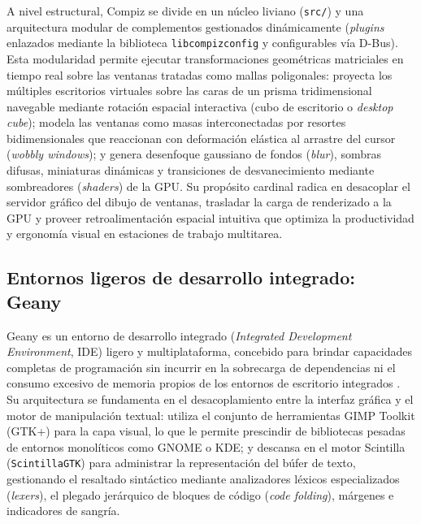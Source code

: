 \documentclass[12pt]{article}
\begin{document}
A nivel estructural, Compiz se divide en un núcleo liviano (\texttt{src/}) y una arquitectura modular de complementos gestionados dinámicamente (\textit{plugins} enlazados mediante la biblioteca \texttt{libcompizconfig} y configurables vía D-Bus). Esta modularidad permite ejecutar transformaciones geométricas matriciales en tiempo real sobre las ventanas tratadas como mallas poligonales: proyecta los múltiples escritorios virtuales sobre las caras de un prisma tridimensional navegable mediante rotación espacial interactiva (cubo de escritorio o \textit{desktop cube}); modela las ventanas como masas interconectadas por resortes bidimensionales que reaccionan con deformación elástica al arrastre del cursor (\textit{wobbly windows}); y genera desenfoque gaussiano de fondos (\textit{blur}), sombras difusas, miniaturas dinámicas y transiciones de desvanecimiento mediante sombreadores (\textit{shaders}) de la GPU. Su propósito cardinal radica en desacoplar el servidor gráfico del dibujo de ventanas, trasladar la carga de renderizado a la GPU y proveer retroalimentación espacial intuitiva que optimiza la productividad y ergonomía visual en estaciones de trabajo multitarea.

\subsection{Entornos ligeros de desarrollo integrado: Geany}
\label{sec:geany}

Geany es un entorno de desarrollo integrado (\textit{Integrated Development Environment}, IDE) ligero y multiplataforma, concebido para brindar capacidades completas de programación sin incurrir en la sobrecarga de dependencias ni el consumo excesivo de memoria propios de los entornos de escritorio integrados \parencite{geanyProject}. Su arquitectura se fundamenta en el desacoplamiento entre la interfaz gráfica y el motor de manipulación textual: utiliza el conjunto de herramientas GIMP Toolkit (GTK+) para la capa visual, lo que le permite prescindir de bibliotecas pesadas de entornos monolíticos como GNOME o KDE; y descansa en el motor Scintilla (\texttt{ScintillaGTK}) para administrar la representación del búfer de texto, gestionando el resaltado sintáctico mediante analizadores léxicos especializados (\textit{lexers}), el plegado jerárquico de bloques de código (\textit{code folding}), márgenes e indicadores de sangría.
\end{document}
